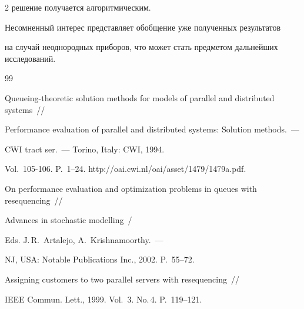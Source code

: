 \begin{multicols}{2}
решение получается алгоритмическим.





Несомненный интерес представляет обобщение уже полученных результатов


на случай неоднородных приборов, что может стать предметом дальнейших исследований.





{\small\frenchspacing


 {%




 \begin{thebibliography}{99}









Queueing-theoretic solution methods for models of parallel and distributed systems~// 


Performance evaluation of parallel and distributed systems: Solution methods.~--- 


CWI tract ser.~---  Torino, Italy: CWI, 1994.


Vol.~105-106. P.~1--24. {\sf http://oai.cwi.nl/oai/asset/1479/1479a.pdf}.






On performance evaluation and optimization problems in queues with resequencing~//


Advances in stochastic modelling~/


Eds. J.\,R.~Artalejo, A.~Krishnamoorthy.~---


NJ, USA: Notable Publications Inc.,  2002. P.~55--72.












Assigning customers to two parallel servers with resequencing~//


IEEE Commun. Lett., 1999. Vol.~3. No.\,4. P.~119--121.








\end{thebibliography}}}
\end{multicols}
